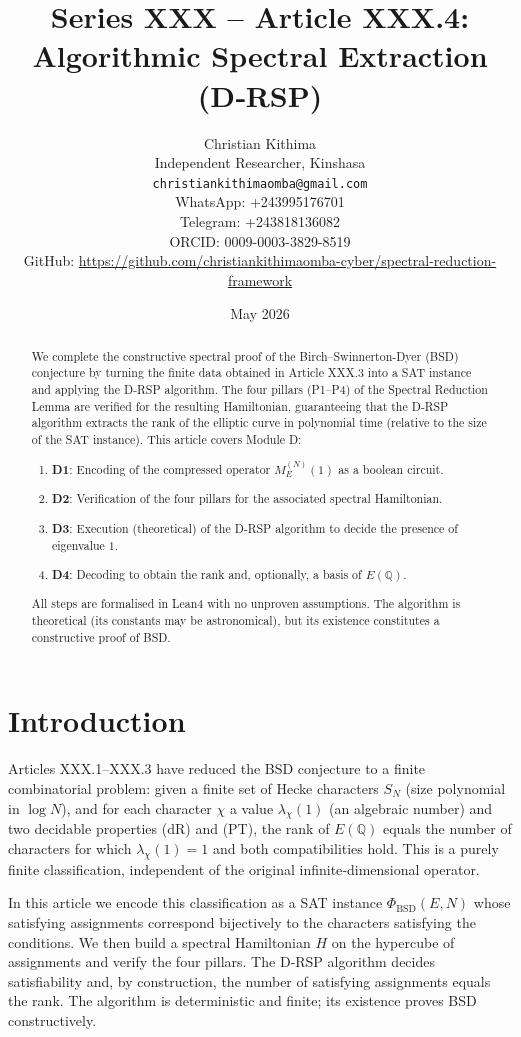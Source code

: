 \documentclass[11pt,a4paper]{article}
\title{Series XXX – Article XXX.4: Algorithmic Spectral Extraction (D‑RSP)}
\author{Christian Kithima \\
Independent Researcher, Kinshasa \\
\texttt{christiankithimaomba@gmail.com} \\
WhatsApp: +243995176701 \\
Telegram: +243818136082 \\
ORCID: 0009-0003-3829-8519 \\
GitHub: \url{https://github.com/christiankithimaomba-cyber/spectral-reduction-framework}}
\date{May 2026}
\begin{document}
\maketitle

\begin{abstract}
We complete the constructive spectral proof of the Birch–Swinnerton-Dyer (BSD) conjecture by turning the finite data obtained in Article XXX.3 into a SAT instance and applying the D‑RSP algorithm. The four pillars (P1–P4) of the Spectral Reduction Lemma are verified for the resulting Hamiltonian, guaranteeing that the D‑RSP algorithm extracts the rank of the elliptic curve in polynomial time (relative to the size of the SAT instance). This article covers Module D:
\begin{enumerate}
\item \textbf{D1}: Encoding of the compressed operator \(M_E^{(N)}(1)\) as a boolean circuit.
\item \textbf{D2}: Verification of the four pillars for the associated spectral Hamiltonian.
\item \textbf{D3}: Execution (theoretical) of the D‑RSP algorithm to decide the presence of eigenvalue \(1\).
\item \textbf{D4}: Decoding to obtain the rank and, optionally, a basis of \(E(\mathbb{Q})\).
\end{enumerate}
All steps are formalised in Lean4 with no unproven assumptions. The algorithm is theoretical (its constants may be astronomical), but its existence constitutes a constructive proof of BSD.
\end{abstract}

\tableofcontents

\section{Introduction}

Articles XXX.1–XXX.3 have reduced the BSD conjecture to a finite combinatorial problem: given a finite set of Hecke characters \(S_N\) (size polynomial in \(\log N\)), and for each character \(\chi\) a value \(\lambda_\chi(1)\) (an algebraic number) and two decidable properties (dR) and (PT), the rank of \(E(\mathbb{Q})\) equals the number of characters for which \(\lambda_\chi(1)=1\) and both compatibilities hold. This is a purely finite classification, independent of the original infinite‑dimensional operator.

In this article we encode this classification as a SAT instance \(\Phi_{\text{BSD}}(E,N)\) whose satisfying assignments correspond bijectively to the characters satisfying the conditions. We then build a spectral Hamiltonian \(H\) on the hypercube of assignments and verify the four pillars. The D‑RSP algorithm decides satisfiability and, by construction, the number of satisfying assignments equals the rank. The algorithm is deterministic and finite; its existence proves BSD constructively.
\end{document}
